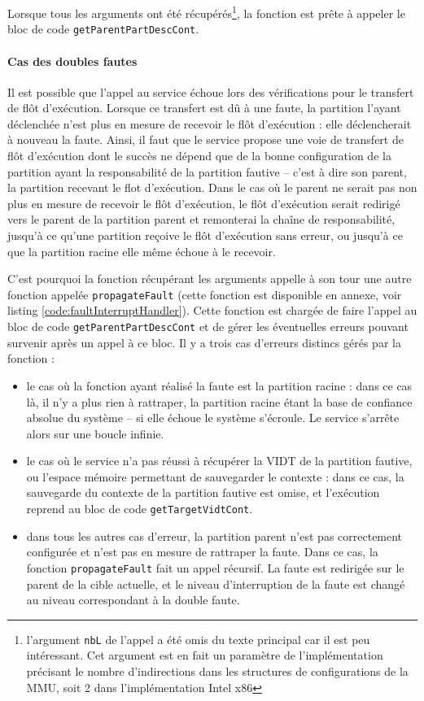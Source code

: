 		Lorsque tous les arguments ont été récupérés\footnote{l'argument \texttt{nbL} de l'appel a été omis du texte principal car il est peu intéressant. Cet argument est en fait un paramètre de l'implémentation précisant le nombre d'indirections dans les structures de configurations de la MMU, soit 2 dans l'implémentation Intel x86}, la fonction est prête à appeler le bloc de code \texttt{getParentPartDescCont}.

		\paragraph{Cas des doubles fautes} Il est possible que l'appel au service échoue lors des vérifications pour le transfert de flôt d'exécution. Lorsque ce transfert est dû à une faute, la partition l'ayant déclenchée n'est plus en mesure de recevoir le flôt d'exécution : elle déclencherait à nouveau la faute. Ainsi, il faut que le service propose une voie de transfert de flôt d'exécution dont le succès ne dépend que de la bonne configuration de la partition ayant la responsabilité de la partition fautive -- c'est à dire son parent, la partition recevant le flot d'exécution.
		Dans le cas où le parent ne serait pas non plus en mesure de recevoir le flôt d'exécution, le flôt d'exécution serait redirigé vers le parent de la partition parent et remonterai la chaîne de responsabilité, jusqu'à ce qu'une partition reçoive le flôt d'exécution sans erreur, ou jusqu'à ce que la partition racine elle même échoue à le recevoir.

		C'est pourquoi la fonction récupérant les arguments appelle à son tour une autre fonction appelée \texttt{propagateFault} (cette fonction est disponible en annexe, voir listing \ref{code:faultInterruptHandler}). Cette fonction est chargée de faire l'appel au bloc de code \texttt{getParentPartDescCont} et de gérer les éventuelles erreurs pouvant survenir après un appel à ce bloc. Il y a trois cas d'erreurs distincs gérés par la fonction :
		\begin{itemize}
			\item le cas où la fonction ayant réalisé la faute est la partition racine : dans ce cas là, il n'y a plus rien à rattraper, la partition racine étant la base de confiance absolue du système -- si elle échoue le système s'écroule. Le service s'arrête alors sur une boucle infinie.
			\item le cas où le service n'a pas réussi à récupérer la VIDT de la partition fautive, ou l'espace mémoire permettant de sauvegarder le contexte : dans ce cas, la sauvegarde du contexte de la partition fautive est omise, et l'exécution reprend au bloc de code \texttt{getTargetVidtCont}.
			\item dans tous les autres cas d'erreur, la partition parent n'est pas correctement configurée et n'est pas en mesure de rattraper la faute. Dans ce cas, la fonction \texttt{propagateFault} fait un appel récursif. La faute est redirigée sur le parent de la cible actuelle, et le niveau d'interruption de la faute est changé au niveau correspondant à la double faute.
		\end{itemize}

